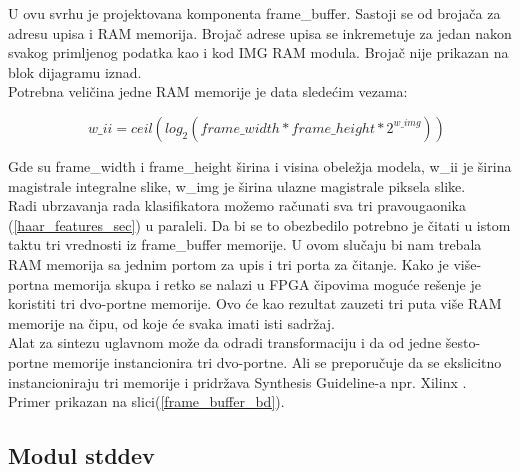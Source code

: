 U ovu svrhu je projektovana komponenta frame\_buffer.
Sastoji se od brojača za adresu upisa i RAM memorija.
Brojač adrese upisa se inkremetuje za jedan nakon svakog primljenog podatka kao
i kod IMG RAM modula.
Brojač nije prikazan na blok dijagramu iznad. \\
Potrebna veličina jedne RAM memorije je data sledećim vezama:

\begin{figure}[H]
  \begin{subfigure}
    \begin{equation}
      size[bit] = frame\_width * frame\_height * w\_ii
      \label{frame_buffer_eq1}
    \end{equation}
  \end{subfigure}
  \hfill
  \begin{subfigure}
    \vspace{-1.4\baselineskip}
    \begin{equation}
      w\_ii = ceil(log_2(frame\_width * frame\_height * 2^{w\_img}))
      \label{frame_buffer_eq2}
    \end{equation}
  \end{subfigure}
\end{figure}
\vspace{-1.4\baselineskip}
Gde su frame\_width i frame\_height širina i visina obeležja modela, w\_ii je
širina magistrale integralne slike, w\_img je širina ulazne magistrale piksela
slike. \\

Radi ubrzavanja rada klasifikatora možemo računati sva tri pravougaonika (\ref{haar_features_sec}) u paraleli.
Da bi se to obezbedilo potrebno je čitati u istom taktu tri vrednosti iz
frame\_buffer memorije.
U ovom slučaju bi nam trebala RAM memorija sa jednim portom za upis i tri porta
za čitanje.
Kako je više-portna memorija skupa i retko se nalazi u FPGA čipovima moguće
rešenje je koristiti tri dvo-portne memorije.
Ovo će kao rezultat zauzeti tri puta više RAM memorije na čipu, od koje će svaka
imati isti sadržaj.\\

Alat za sintezu uglavnom može da odradi transformaciju i da od jedne šesto-portne
memorije instancionira tri dvo-portne.
Ali se preporučuje da se ekslicitno instancioniraju tri memorije i pridržava
Synthesis Guideline-a npr. Xilinx \cite{XST}. \\
Primer prikazan na slici(\ref{frame_buffer_bd}).

\subsection{Modul stddev}

